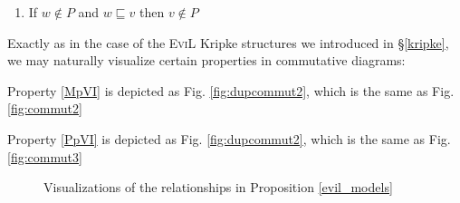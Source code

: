 \begin{definition}
\begin{minipage}[b]{0.5\linewidth}
\begin{enumerate}[label=\textup{(\emph{\Roman*})$^\BP$}, topsep=0.0in, parsep=0.075in]
    \item\label{PpIX} If $w \nin P$ and $w \sqsubseteq v$ then $v
     \nin P$
  \end{enumerate}
\end{minipage}
\end{definition}

Exactly as in the case of the \textsc{EviL} Kripke structures we
introduced in \S\ref{kripke}, we may naturally visualize certain
properties in commutative diagrams:
\begin{bul}
\item  Property \ref{MpVI} is depicted as
Fig. \ref{fig:dupcommut2}, which is the same as Fig. \ref{fig:commut2}
\item  Property \ref{PpVI} is depicted as
Fig. \ref{fig:dupcommut2}, which is the same as Fig. \ref{fig:commut3}
\end{bul}

\begin{figure}[ht]
\centering
\hspace{1cm}
\caption{Visualizations of the relationships in Proposition \ref{evil_models}}
\end{figure}

